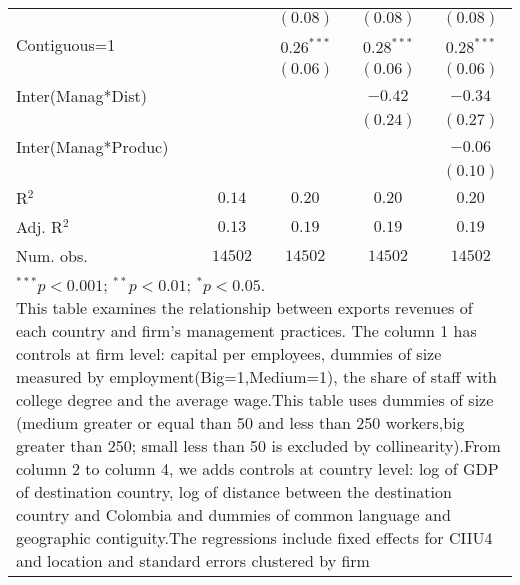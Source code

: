 \documentclass{article}
\begin{document}
\begin{table}
\begin{center}
\begin{normalsize}
\begin{tabular}{l c c c c}
                        &              & $(0.08)$      & $(0.08)$     & $(0.08)$     \\
Contiguous=1            &              & $0.26^{***}$  & $0.28^{***}$ & $0.28^{***}$ \\
                        &              & $(0.06)$      & $(0.06)$     & $(0.06)$     \\
Inter(Manag*Dist)       &              &               & $-0.42$      & $-0.34$      \\
                        &              &               & $(0.24)$     & $(0.27)$     \\
Inter(Manag*Produc)     &              &               &              & $-0.06$      \\
                        &              &               &              & $(0.10)$     \\
\hline
R$^2$                   & $0.14$       & $0.20$        & $0.20$       & $0.20$       \\
Adj. R$^2$              & $0.13$       & $0.19$        & $0.19$       & $0.19$       \\
Num. obs.               & $14502$      & $14502$       & $14502$      & $14502$      \\
\hline
\multicolumn{5}{l}{\scriptsize{\parbox{1\linewidth}{\vspace{3pt}$^{***}p<0.001$; $^{**}p<0.01$; $^{*}p<0.05$. \\ This table examines the relationship between exports revenues of each country and firm's management practices. The column 1 has controls at firm level: capital per employees, dummies of size measured by employment(Big=1,Medium=1), the share of staff with college degree and the average wage.This table uses dummies of size (medium greater or equal than 50 and less than 250 workers,big greater than 250; small less than 50 is excluded by collinearity).From column 2 to column 4, we adds controls at country level: log of GDP of destination country, log of distance between the destination country and Colombia and dummies of common language and geographic contiguity.The regressions include fixed effects for CIIU4 and location and standard errors clustered by firm}}}
\end{tabular}
\end{normalsize}
\label{table:coefficients}
\end{center}
\end{table}
\end{document}
